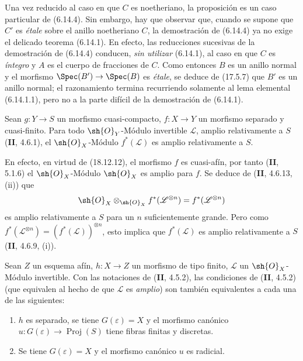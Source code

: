 Una vez reducido al caso en que $C$ es noetheriano, la proposición es un caso particular de (6.14.4). Sin embargo, hay que observar que, cuando se supone que $C'$ es \emph{étale} sobre el anillo noetheriano $C$, la demostración de (6.14.4) ya no exige el delicado teorema (6.14.1). En efecto, las reducciones sucesivas de la demostración de (6.14.4) conducen, \emph{sin utilizar} (6.14.1), al caso en que $C$ es \emph{íntegro} y $A$ es el cuerpo de fracciones de $C$. Como entonces $B$ es un anillo normal y el morfismo $\Spec(B')\to\Spec(B)$ es \emph{étale}, se deduce de (17.5.7) que $B'$ es un anillo normal; el razonamiento termina recurriendo solamente al lema elemental (6.14.1.1), pero no a la parte difícil de la demostración de (6.14.1).

\begin{proposition}[18.12.16]
\label{IV.18.12.16}
Sean $g:Y\to S$ un morfismo cuasi-compacto, $f:X\to Y$ un morfismo separado y cuasi-finito. Para todo $\sh{O}_Y$-Módulo invertible $\mathscr L$, amplio relativamente a $S$ \textup{(\textbf{II}, 4.6.1)}, el $\sh{O}_X$-Módulo $f^*(\mathscr L)$ es amplio relativamente a $S$.
\end{proposition}

En efecto, en virtud de (18.12.12), el morfismo $f$ es cuasi-afín, por tanto (\textbf{II}, 5.1.6) el $\sh{O}_X$-Módulo $\sh{O}_X$ es amplio para $f$. Se deduce de (\textbf{II}, 4.6.13, (ii)) que
\[
  \sh{O}_X\otimes_{\sh{O}_X}f^*(\mathscr L^{\otimes n})=f^*(\mathscr L^{\otimes n})
\]
es amplio relativamente a $S$ para un $n$ suficientemente grande. Pero como $f^*(\mathscr L^{\otimes n})=(f^*(\mathscr L))^{\otimes n}$, esto implica que $f^*(\mathscr L)$ es amplio relativamente a $S$ (\textbf{II}, 4.6.9, (i)).

\begin{corollary}[18.12.17]
\label{IV.18.12.17}
Sean $Z$ un esquema afín, $h:X\to Z$ un morfismo de tipo finito, $\mathscr L$ un $\sh{O}_X$-Módulo invertible. Con las notaciones de \textup{(\textbf{II}, 4.5.2)}, las condiciones de \textup{(\textbf{II}, 4.5.2)} \textup{(que equivalen al hecho de que $\mathscr L$ es \emph{amplio})} son también equivalentes a cada una de las siguientes:
\begin{enumerate}
  \item[\textup{b$''$)}] $h$ es separado, se tiene $G(\varepsilon)=X$ y el morfismo canónico $u:G(\varepsilon)\to\operatorname{Proj}(S)$ tiene fibras finitas y discretas.
  \item[\textup{b$'''$)}] Se tiene $G(\varepsilon)=X$ y el morfismo canónico $u$ es radicial.
\end{enumerate}
\end{corollary}

